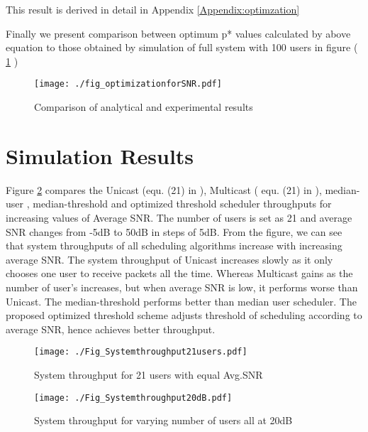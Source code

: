 \documentclass[conference]{IEEEtran}
\begin{document}
This result is derived in detail in Appendix \ref{Appendix:optimzation}

Finally we present comparison between optimum p* values calculated by above equation to those obtained by simulation of full system with 100 users in figure ( \ref{Fig: Optimzation_analytical} )



\begin{figure}[h!]
\begin{center}
    \texttt{[image: ./fig\_optimizationforSNR.pdf]}
  \end{center}
  \vspace{-130pt}
 \caption{Comparison of analytical and experimental results}\label{Fig: Optimzation_analytical}
\end{figure}



















\section{Simulation Results}

Figure \ref{Systemthroughput20users} compares the Unicast (equ. (21) in \cite{Multi_vs_Uni}), Multicast  ( equ. (21) in  \cite{Multi_vs_Uni} ), median-user \cite{Praveen_Kumar} , median-threshold and optimized threshold scheduler throughputs for increasing values of Average SNR. The number of users is set as 21 and average SNR changes from -5dB to 50dB in steps of 5dB. From the figure, we can see that system throughputs of all scheduling algorithms increase with increasing average SNR. The system throughput of Unicast increases slowly as it only chooses one user to receive packets all the time. Whereas Multicast gains as the number of user’s increases, but when average SNR is low, it performs worse than Unicast. The median-threshold performs better than median user scheduler. The proposed optimized threshold scheme adjusts threshold of scheduling according to average SNR, hence achieves better throughput.
 
\begin{figure}[h]
\begin{center}
    \texttt{[image: ./Fig\_Systemthroughput21users.pdf]}
  \end{center}
  \vspace{-150pt}
  \caption{System throughput for 21 users with equal Avg.SNR }\label{Systemthroughput20users}
\end{figure}
\begin{figure}[h!]
\begin{center}
    \texttt{[image: ./Fig\_Systemthroughput20dB.pdf]}
  \end{center}
  \vspace{-10pt}
  \caption{System throughput for varying number of users all at 20dB}\label{Systemthroughput20dB}
\end{figure}
\end{document}
